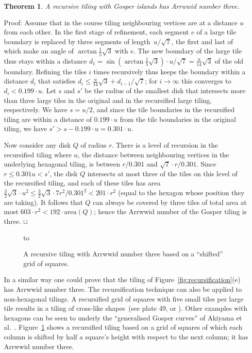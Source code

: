 \documentclass[11pt,a4paper]{article}
\newcommand{\area}{\mathrm{area}}
\newtheorem{theorem}{Theorem}
\newenvironment{proof}{Proof:}{\qed}
\def\squareforqed{\hbox{\rlap{$\sqcap$}$\sqcup$}}
\def\qed{\ifmmode\squareforqed\else{\unskip\nobreak\hfil
\penalty50\hskip1em\null\nobreak\hfil\squareforqed
\parfillskip=0pt\finalhyphendemerits=0\endgraf}\fi}
\begin{document}
\begin{theorem}\label{th:gosper}
A recursive tiling with Gosper islands has Arrwwid number three.
\end{theorem}
\begin{proof}
Assume that in the course tiling neighbouring vertices are at a distance $u$ from each other. In the first stage of refinement, each segment $e$ of a large tile boundary is replaced by three segments of length~$u/\sqrt{7}$, the first and last of which make an angle of $\arctan{\frac15 \sqrt{3}}$ with $e$. The new boundary of the large tile thus stays within a distance $d_1 = \sin(\arctan{\frac15 \sqrt{3}})\cdot u/\sqrt{7} = \frac{u}{14}\sqrt{3}$ of the old boundary. Refining the tiles $i$ times recursively thus keeps the boundary within a distance $d_i$ that satisfies $d_i \leq \frac{u}{14}\sqrt{3} + d_{i-1}/\sqrt{7}$; for $i \rightarrow \infty$ this converges to $d_i < 0.199 \cdot u$. Let $s$ and $s'$ be the radius of the smallest disk that intersects more than three large tiles in the original and in the recursified large tiling, respectively. We have $s = u/2$, and since the tile boundaries in the recursified tiling are within a distance of $0.199 \cdot u$ from the tile boundaries in the original tiling, we have $s' > s - 0.199 \cdot u = 0.301 \cdot u$.

Now consider any disk $Q$ of radius $r$. There is a level of recursion in the recursified tiling where $u$, the distance between neighbouring vertices in the underlying hexagonal tiling, is between $r/0.301$ and $\sqrt{7}\cdot r/0.301$. Since $r \leq 0.301 u < s'$, the disk $Q$ intersects at most three of the tiles on this level of the recursified tiling, and each of these tiles has area $\frac32 \sqrt{3} \cdot u^2  \leq \frac32 \sqrt{3} \cdot 7 r^2 / 0.301^2 < 201 \cdot r^2$ (equal to the hexagon whose position they are taking). It follows that $Q$ can always be covered by three tiles of total area at most $603 \cdot r^2 < 192 \cdot \area(Q)$; hence the Arrwwid number of the Gosper tiling is three.
\end{proof}

\begin{figure}
\centering
\hbox to 
\caption{A recursive tiling with Arrwwid number three based on a ``shifted'' grid of squares.}
\label{fig:shiftedsquares}
\end{figure}

\enlargethispage{\baselineskip}
In a similar way one could prove that the tiling of Figure~\ref{fig:recursification}(e) has Arrwwid number three. The recursification technique can also be applied to non-hexagonal tilings. A recursified grid of squares with five small tiles per large tile results in a tiling of cross-like shapes~(see \cite{Mandelbrot1983} plate 49, or \cite{Teachout2009}). Other examples with hexagons can be seen to underly the ``generalised Gosper curves'' of Akiyama et al.~\cite{Akiyama2005}. Figure~\ref{fig:shiftedsquares} shows a recursified tiling based on a grid of squares of which each column is shifted by half a square's height with respect to the next column; it has Arrwwid number three.
\end{document}
